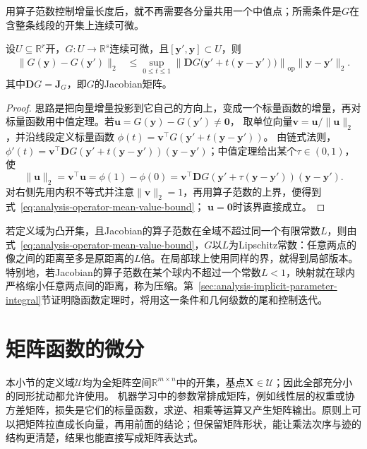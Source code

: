 用算子范数控制增量长度后，就不再需要各分量共用一个中值点；所需条件是$G$在含整条线段的开集上连续可微。
\begin{theorem}[向量值函数的中值估计]
\label{thm:multivariable-vector-mean-value}
设$U\subseteq\mathbb R^r$开，$G:U\to\mathbb R^s$连续可微，且$[\bm y',\bm y]\subset U$，则
\begin{equation}
  \begin{aligned}
  \lVert G(\bm{y})-G(\bm{y}')\rVert_2
  &\leq
  \sup_{0\leq t\leq1}
  \left\lVert
    \bm{D}G\bigl(\bm{y}'+t(\bm{y}-\bm{y}')\bigr)
  \right\rVert_{\mathrm{op}}
  \lVert\bm{y}-\bm{y}'\rVert_2.
  \end{aligned}
\label{eq:analysis-operator-mean-value-bound}
\end{equation}
其中$\bm DG=\bm J_G$，即$G$的Jacobian矩阵。
\end{theorem}
\begin{proof}
思路是把向量增量投影到它自己的方向上，变成一个标量函数的增量，再对标量函数用中值定理。若$\bm u=G(\bm y)-G(\bm y')\neq\bm0$，
取单位向量$\bm v=\bm u/\lVert\bm u\rVert_2$，并沿线段定义标量函数
$\phi(t)=\bm v^\top G(\bm y'+t(\bm y-\bm y'))$。
由链式法则，$\phi'(t)=\bm v^\top\bm DG(\bm y'+t(\bm y-\bm y'))(\bm y-\bm y')$；中值定理给出某个$\tau\in(0,1)$，使
\[
 \lVert\bm u\rVert_2
 =\bm v^\top\bm u
 =\phi(1)-\phi(0)
 =\bm v^\top\bm DG(\bm y'+\tau(\bm y-\bm y'))(\bm y-\bm y').
\]
对右侧先用内积不等式并注意$\lVert\bm v\rVert_2=1$，再用算子范数的上界，便得到式~\eqref{eq:analysis-operator-mean-value-bound}；
$\bm u=\bm0$时该界直接成立。
\end{proof}
若定义域为凸开集，且Jacobian的算子范数在全域不超过同一个有限常数$L$，则由式~\eqref{eq:analysis-operator-mean-value-bound}，$G$以$L$为Lipschitz常数：任意两点的像之间的距离至多是原距离的$L$倍。在局部球上使用同样的界，就得到局部版本。
特别地，若Jacobian的算子范数在某个球内不超过一个常数$L<1$，映射就在球内严格缩小任意两点间的距离，称为压缩。第~\ref{sec:analysis-implicit-parameter-integral}节证明隐函数定理时，将用这一条件和几何级数的尾和控制迭代。

\section{矩阵函数的微分}

本小节的定义域$\mathcal U$均为全矩阵空间$\mathbb R^{m\times n}$中的开集，基点$\bm X\in\mathcal U$；因此全部充分小的同形扰动都允许使用。
机器学习中的参数常排成矩阵，例如线性层的权重或协方差矩阵，损失是它们的标量函数，求逆、相乘等运算又产生矩阵输出。原则上可以把矩阵拉直成长向量，再用前面的结论；但保留矩阵形状，能让乘法次序与迹的结构更清楚，结果也能直接写成矩阵表达式。

